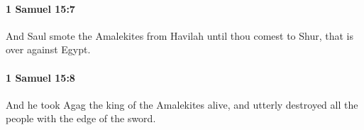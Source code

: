 		\paragraph{1 Samuel 15:7} %
			\label{1SAMUEL-15-7}

			And Saul smote the Amalekites from Havilah until thou comest to Shur, that is over against Egypt.


		\paragraph{1 Samuel 15:8} %
			\label{1SAMUEL-15-8}

			And he took Agag the king of the Amalekites alive, and utterly destroyed all the people with the edge of the sword.


